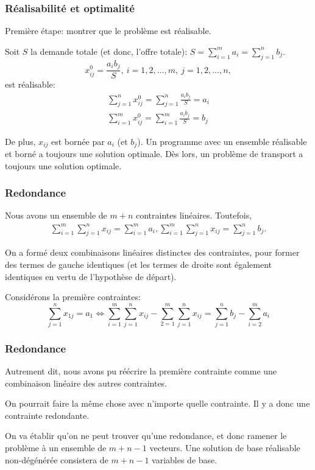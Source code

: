 \documentclass[usepdftitle=false]{beamer}
\begin{document}
\begin{frame}
\frametitle{Réalisabilité et optimalité}

Première étape: montrer que le problème est réalisable.

\mbox{}

Soit $S$ la demande totale (et donc, l'offre totale): $S = \sum_{i = 1}^m a_i = \sum_{j = 1}^n b_j$.
\[
x^0_{ij} = \frac{a_ib_j}{S},\ i=1,2,\ldots,m,\ j = 1,2,\ldots,n,
\]
est réalisable:
\begin{align*}
\sum_{j = 1}^n x^0_{ij} = \sum_{j = 1}^n \frac{a_ib_j}{S} = a_i \\
\sum_{i = 1}^m x^0_{ij} = \sum_{i = 1}^m \frac{a_ib_j}{S} = b_j
\end{align*}

\mbox{}

De plus, $x_{ij}$ est bornée par $a_i$ (et $b_j$).
Un programme avec un ensemble réalisable et borné a toujours une solution optimale. Dès lors, un problème de transport a toujours une solution optimale.

\end{frame}

\begin{frame}
\frametitle{Redondance}

Nous avons un ensemble de $m+n$ contraintes linéaires. Toutefois,
\begin{align*}
\sum_{i = 1}^m \sum_{j = 1}^n x_{ij} = \sum_{i = 1}^m a_i,
\sum_{i = 1}^m \sum_{j = 1}^n x_{ij} = \sum_{j = 1}^n b_j.
\end{align*}

\mbox{}

On a formé deux combinaisons linéaires distinctes des contraintes, pour former des termes de gauche identiques (et les termes de droite sont également identiques en vertu de l'hypothèse de départ).

\mbox{}

Considérons la première contraintes:
\[
\sum_{j = 1}^n x_{1j} = a_1
\Leftrightarrow
\sum_{i = 1}^m \sum_{j = 1}^n x_{ij} - 
\sum_{2 = 1}^m \sum_{j = 1}^n x_{ij}
= \sum_{j =1}^n b_j - \sum_{i = 2}^m a_i
\]

\end{frame}

\begin{frame}
\frametitle{Redondance}

Autrement dit, nous avons pu réécrire la première contrainte comme une combinaison linéaire des autres contraintes.

\mbox{}

On pourrait faire la même chose avec n'importe quelle contrainte. Il y a donc une contrainte redondante.

\mbox{}

On va établir qu'on ne peut trouver qu'une redondance, et donc ramener le problème à un ensemble de $m + n - 1$ vecteurs. Une solution de base réalisable non-dégénérée consistera de $m + n -1$ variables de base.

\end{frame}
\end{document}
